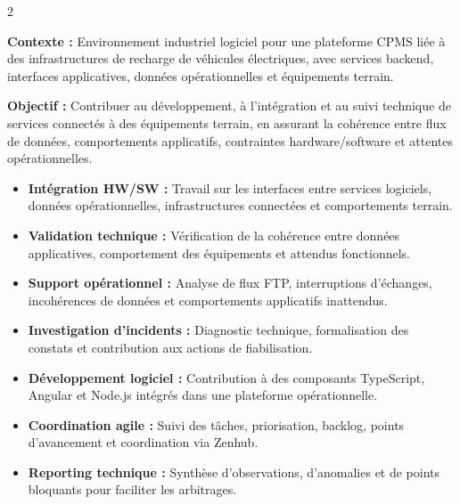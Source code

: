 \documentclass[8pt,a4paper,ragged2e,withhyper]{altacv}
\begin{document}



\makecvheader
\vspace{-0.3cm}


\begin{paracol}{2}



\textbf{Contexte :} Environnement industriel logiciel pour une plateforme CPMS liée à des infrastructures de recharge de véhicules électriques, avec services backend, interfaces applicatives, données opérationnelles et équipements terrain.

\textbf{Objectif :} Contribuer au développement, à l’intégration et au suivi technique de services connectés à des équipements terrain, en assurant la cohérence entre flux de données, comportements applicatifs, contraintes hardware/software et attentes opérationnelles.

\begin{itemize}
  \item \textbf{Intégration HW/SW :} Travail sur les interfaces entre services logiciels, données opérationnelles, infrastructures connectées et comportements terrain.
  \item \textbf{Validation technique :} Vérification de la cohérence entre données applicatives, comportement des équipements et attendus fonctionnels.
  \item \textbf{Support opérationnel :} Analyse de flux FTP, interruptions d’échanges, incohérences de données et comportements applicatifs inattendus.
  \item \textbf{Investigation d’incidents :} Diagnostic technique, formalisation des constats et contribution aux actions de fiabilisation.
  \item \textbf{Développement logiciel :} Contribution à des composants TypeScript, Angular et Node.js intégrés dans une plateforme opérationnelle.
  \item \textbf{Coordination agile :} Suivi des tâches, priorisation, backlog, points d’avancement et coordination via Zenhub.
  \item \textbf{Reporting technique :} Synthèse d’observations, d’anomalies et de points bloquants pour faciliter les arbitrages.
\end{itemize}


\end{paracol}
\end{document}
